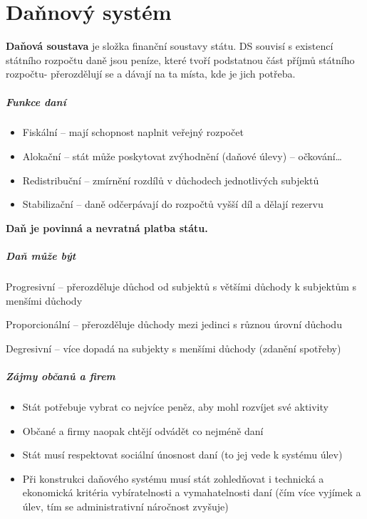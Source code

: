 \chapter{Daňnový systém}

\textbf{Daňová soustava} je složka finanční soustavy státu. DS souvisí s existencí státního rozpočtu daně jsou peníze, které tvoří podstatnou část příjmů státního rozpočtu- přerozdělují se a dávají na ta místa, kde je jich potřeba.

\paragraph{Funkce daní}
\begin{itemize}
    \item Fiskální -- mají schopnost naplnit veřejný rozpočet
    \item Alokační -- stát může poskytovat zvýhodnění (daňové úlevy) -- očkování\ldots
    \item Redistribuční -- zmírnění rozdílů v důchodech jednotlivých subjektů
    \item Stabilizační -- daně odčerpávají do rozpočtů vyšší díl a dělají rezervu
\end{itemize}

\textbf{Daň je povinná a nevratná platba státu.}

\paragraph{Daň může být}
\begin{description}
    \item Progresivní -- přerozděluje důchod od subjektů s většími důchody k subjektům s menšími důchody
    \item Proporcionální -- přerozděluje důchody mezi jedinci s různou úrovní důchodu
    \item Degresivní -- více dopadá na subjekty s menšími důchody (zdanění spotřeby)
\end{description}

\paragraph{Zájmy občanů a firem}
\begin{itemize}
    \item Stát potřebuje vybrat co nejvíce peněz, aby mohl rozvíjet své aktivity
    \item Občané a firmy naopak chtějí odvádět co nejméně daní
    \item Stát musí respektovat sociální únosnost daní (to jej vede k systému úlev)
    \item Při konstrukci daňového systému musí stát zohledňovat i technická a ekonomická kritéria vybíratelnosti a vymahatelnosti daní (čím více vyjímek a úlev, tím se administrativní náročnost zvyšuje)
\end{itemize}


